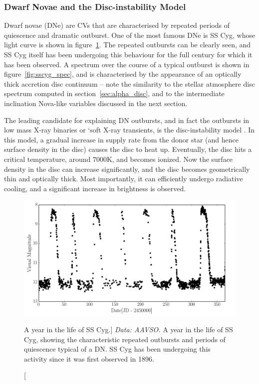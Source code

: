 \subsubsection{Dwarf Novae and the Disc-instability Model}

Dwarf novae (DNe) are CVs that are characterised 
by repeated periods of quiescence and dramatic outburst. One of the 
most famous DNe is SS Cyg, whose light curve is shown in 
figure~\ref{fig:sscyg}. The repeated outbursts can be clearly seen, and
SS Cyg itself has been undergoing this behaviour for the full century 
for which it has been observed. A spectrum over the course of a 
typical outburst is shown in figure~\ref{fig:sscyg_spec}, 
and is characterised by the appearance of an optically thick
accretion disc continuum -- note the similarity to the 
stellar atmosphere disc spectrum computed in section~\ref{sec:alpha_disc},
and to the intermediate inclination Nova-like variables discussed in the next
section.

The leading candidate for explaining DN outbursts, and in fact the outbursts
in low mass X-ray binaries or `soft X-ray transients,
is the disc-instability model 
\citep[DIM; see ][and references therin]{lasota2001}. 
In this model, a gradual
increase in supply rate from the donor star (and hence surface density in the disc) 
causes the disc to heat up. Eventually, the disc hits a critical temperature,
around $7000$K, and becomes ionized. Now the surface density in the disc
can increase significantly, and the disc becomes geometrically thin and
optically thick. Most importantly, it can efficiently undergo radiative
cooling, and a significant increase in brightness is observed.



\begin{figure}
\centering
\includegraphics[width=1.0\textwidth]{figures/01-intro/lc_sscyg.png}
\caption
[A year in the life of SS Cyg.]
{
{\sl Data: AAVSO.} 
A year in the life of SS Cyg, showing the characteristic repeated
outbursts and periods of quiescence typical of a DN. SS Cyg has been
undergoing this activity since it was first observed in 1896.
} 
\label{fig:sscyg}
\end{figure}


